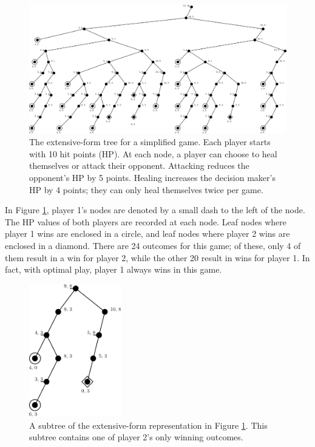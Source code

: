\begin{figure}[H]
  \centering
  \includegraphics[width=15cm]{figures/GameTree.png}
  \caption{The extensive-form tree for a simplified game. Each player starts with 10 hit points (HP). At each node, a player can choose to heal themselves or attack their opponent. Attacking reduces the opponent's HP by 5 points. Healing increases the decision maker's HP by 4 points; they can only heal themselves twice per game.}
  \label{fig:gameTree}
\end{figure}

In Figure \ref{fig:gameTree}, player 1's nodes are denoted by a small dash to the left of the node. The HP values of both players are recorded at each node. Leaf nodes where player 1 wins are enclosed in a circle, and leaf nodes where player 2 wins are enclosed in a diamond. There are 24 outcomes for this game; of these, only 4 of them result in a win for player 2, while the other 20 result in wins for player 1. In fact, with optimal play, player 1 always wins in this game.\\

\begin{figure}[H]
  \centering
  \includegraphics[width=4cm]{figures/GameSubtree.png}
  \caption{A subtree of the extensive-form representation in Figure \ref{fig:gameTree}. This subtree contains one of player 2's only winning outcomes.}
  \label{fig:gameSubtree}
\end{figure}

